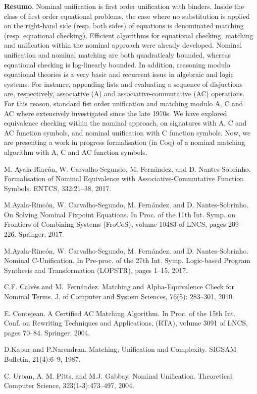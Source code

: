 	\noindent\textbf{Resumo}.\label{wcs} 
	Nominal unification is first order unification with binders. Inside the class of first order equational problems, the case where no substitution is applied on the right-hand side (resp. both sides) of equations is denominated matching (resp. equational checking). Efficient algorithms for equational checking, matching and unification within the nominal approach were already developed. Nominal unification and nominal matching are both quadraticaly bounded, whereas equational checking is log-linearly bounded.  In addition, reasoning modulo equational theories is a very basic and recurrent issue in algebraic and logic systems. For instance, appending lists and evaluating a sequence of disjuctions are, respectively, associative (A) and associative-commutative (AC) operations. For this reason, standard fist order unification and matching modulo A, C and AC where extensively investigated since the late 1970s. We have explored equivalence checking within the nominal approach, on signatures with A, C and AC function symbols, and nominal unification with C function symbols. Now, we are presenting a work in progress formalisation (in Coq) of a nominal matching algorithm with A, C and AC function symbols.
	
	\begin{thebibliography}{999}
	\bibitem{} M. Ayala-Rincón, W. Carvalho-Segundo, M. Fernández, and D. Nantes-Sobrinho.	Formalisation of Nominal Equivalence with Associative-Commutative Function Symbols. ENTCS, 332:21--38, 2017.
	
	\bibitem{}  M.Ayala-Rincón, W. Carvalho-Segundo, M. Fernández, and D. Nantes-Sobrinho. On Solving Nominal Fixpoint Equations.  In Proc. of the 11th Int. Symp. on Frontiers of Combining  Systems (FroCoS), volume 10483 of  LNCS, pages 209--226. Springer, 2017.
	
	\bibitem{}  M.Ayala-Rincón, W. Carvalho-Segundo, M. Fernández, and D. Nantes-Sobrinho. Nominal C-Unification. In Pre-proc. of the 27th Int. Symp. Logic-based Program Synthesis and Transformation (LOPSTR), pages 1--15, 2017.
		
	\bibitem{}  C.F. Calvès and  M.~Fernández. Matching and Alpha-Equivalence Check for  Nominal Terms.  J. of Computer and System Sciences, 76(5): 283--301, 2010.
		
	\bibitem{} E. Contejean. A Certified AC Matching Algorithm. In Proc. of the 15th Int. Conf. on Rewriting Techniques and Applications, (RTA), 	volume 3091 of LNCS, pages 70--84. Springer,  2004.
	
	\bibitem{}  D.Kapur and P.Narendran.  Matching, Unification and Complexity. SIGSAM Bulletin, 21(4):6--9, 1987.
	
	\bibitem{}  C. Urban, A. M. Pitts, and M.J. Gabbay.  Nominal Unification. Theoretical Computer Science, 323(1-3):473--497, 2004.
	\end{thebibliography}

	\vspace{24pt}
	


\clearpage	